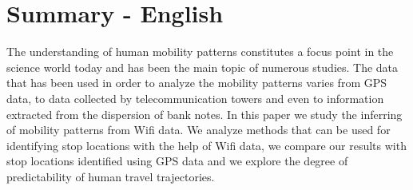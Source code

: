 \chapter{Summary - English}

The understanding of human mobility patterns constitutes a focus point in the
science world today and has been the main topic of numerous studies. The data
that has been used in order to analyze the mobility patterns varies from GPS
data, to data collected by telecommunication towers and even to information
extracted from the dispersion of bank notes. In this paper we study the
inferring of mobility patterns from Wifi data. We analyze methods that can be
used for identifying stop locations with the help of Wifi data, we compare our
results with stop locations identified using GPS data and we explore the degree
of predictability of human travel trajectories.

